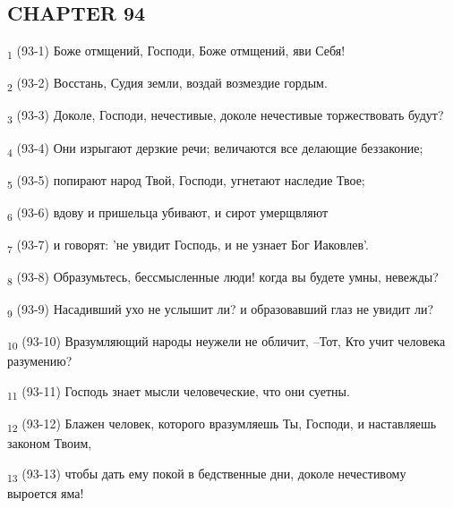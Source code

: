 \subsection{CHAPTER 94}
\begin{tcolorbox}
\textsubscript{1} (93-1) Боже отмщений, Господи, Боже отмщений, яви Себя!
\end{tcolorbox}
\begin{tcolorbox}
\textsubscript{2} (93-2) Восстань, Судия земли, воздай возмездие гордым.
\end{tcolorbox}
\begin{tcolorbox}
\textsubscript{3} (93-3) Доколе, Господи, нечестивые, доколе нечестивые торжествовать будут?
\end{tcolorbox}
\begin{tcolorbox}
\textsubscript{4} (93-4) Они изрыгают дерзкие речи; величаются все делающие беззаконие;
\end{tcolorbox}
\begin{tcolorbox}
\textsubscript{5} (93-5) попирают народ Твой, Господи, угнетают наследие Твое;
\end{tcolorbox}
\begin{tcolorbox}
\textsubscript{6} (93-6) вдову и пришельца убивают, и сирот умерщвляют
\end{tcolorbox}
\begin{tcolorbox}
\textsubscript{7} (93-7) и говорят: 'не увидит Господь, и не узнает Бог Иаковлев'.
\end{tcolorbox}
\begin{tcolorbox}
\textsubscript{8} (93-8) Образумьтесь, бессмысленные люди! когда вы будете умны, невежды?
\end{tcolorbox}
\begin{tcolorbox}
\textsubscript{9} (93-9) Насадивший ухо не услышит ли? и образовавший глаз не увидит ли?
\end{tcolorbox}
\begin{tcolorbox}
\textsubscript{10} (93-10) Вразумляющий народы неужели не обличит, --Тот, Кто учит человека разумению?
\end{tcolorbox}
\begin{tcolorbox}
\textsubscript{11} (93-11) Господь знает мысли человеческие, что они суетны.
\end{tcolorbox}
\begin{tcolorbox}
\textsubscript{12} (93-12) Блажен человек, которого вразумляешь Ты, Господи, и наставляешь законом Твоим,
\end{tcolorbox}
\begin{tcolorbox}
\textsubscript{13} (93-13) чтобы дать ему покой в бедственные дни, доколе нечестивому выроется яма!
\end{tcolorbox}
